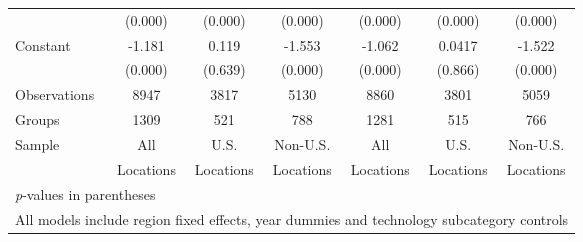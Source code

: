 \begin{table}[htbp]
\begin{tabular}{l*{6}{c}}
                &  (0.000)&  (0.000)&  (0.000)&  (0.000)&  (0.000)&  (0.000)\\
Constant        &   -1.181&    0.119&   -1.553&   -1.062&   0.0417&   -1.522\\
                &  (0.000)&  (0.639)&  (0.000)&  (0.000)&  (0.866)&  (0.000)\\
\hline
Observations    &     8947&     3817&     5130&     8860&     3801&     5059\\
Groups          &     1309&      521&      788&     1281&      515&      766\\
Sample&All &U.S. &Non-U.S.&All &U.S. &Non-U.S. \\
          &Locations &Locations&Locations&Locations &Locations&Locations \\\hline\hline
\multicolumn{7}{l}{\footnotesize \textit{p}-values in parentheses}\\
\multicolumn{7}{l}{\footnotesize All models include region fixed effects, year dummies and technology subcategory controls}\\
\end{tabular}
\end{table}
